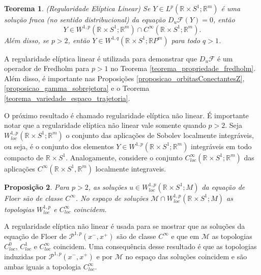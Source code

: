 \documentclass[12pt]{book}
\newtheorem{teorema}{Teorema}[section]
\newtheorem{proposicao}[teorema]{Proposição}
\newcommand{\aplicaoessuaves}[2]{C^{\infty}(#1, #2)}
\newcommand{\caminhosexponenciaisconectantes}[2]{\mathcal{P}^{1,p}(#1, #2)}
\newcommand{\caminhosexponenciaisconectantespadrao}{\caminhosexponenciaisconectantes{x^{-}}{x^{+}}}
\newcommand{\circulo}{S^{1}}
\newcommand{\diferencialfloerponto}[1]{D_{#1}\operadorFloer}
\newcommand{\energiafinitaM}{\mathcal{M}}
\newcommand{\espacoLpcontradominio}[2]{L^{p}(#1;#2)}
\newcommand{\espacosobolevcontradominio}[2]{W^{1,p}(#1;#2)}
\newcommand{\espacosobolevgeral}[2]{W^{1,#1}(#2)}
\newcommand{\operadorFloer}{\mathcal{F}}
\newcommand{\retacartesianocirculo}{\real{} \times \circulo}
\newcommand{\real}[1]{\mathbb{R}^{#1}}
\newcommand{\realprojetivo}[1]{\mathbb{R}P^{#1}}
\begin{document}
	\begin{teorema}\label{teorema_regularidade_eliptica}
		(Regularidade Elíptica Linear) Se $Y \in \espacoLpcontradominio{\retacartesianocirculo}{\real{m}}$ é uma solução fraca (no sentido distribucional) da equação $\diferencialfloerponto{u}(Y) =0$, então 
		$$
		Y \in \espacosobolevcontradominio{\retacartesianocirculo}{\real{m}} \cap C^{\infty}(\retacartesianocirculo;\real{m}).
		$$
		Além disso, se $p>2$, então $Y \in \espacosobolevgeral{q}{\retacartesianocirculo;\realprojetivo{m}}$ para todo $q>1$.
	\end{teorema} 
	
	A regularidade elíptica linear é utilizada para demonstrar que $\diferencialfloerponto{u}$ é um operador de Fredholm para $p>1$ no Teorema \ref{teorema_propriedade_fredholm}. Além disso, é importante nas Proposições  \ref{proposicao_orbitasConectantesZ},  \ref{proposicao_gamma_sobrejetora} e o Teorema \ref{teorema_variedade_espaco_trajetoria}.
	
	O próximo resultado é chamado regularidade elíptica não linear. É importante notar que a regularidade elíptica não linear vale somente quando $p>2$. Seja $W^{1,p}_{loc}(\retacartesianocirculo;\real{m})$ o conjunto das aplicações de Sobolev localmente integráveis, ou seja, é o conjunto dos elementos $Y \in \espacosobolevcontradominio{\retacartesianocirculo}{\real{m}}$ integráveis em todo compacto de $\retacartesianocirculo$. Analogamente, considere o conjunto $C^{\infty}_{loc}(\retacartesianocirculo;\real{m})$ das aplicações $\aplicaoessuaves{\retacartesianocirculo}{\real{m}}$ localmente integraveis.
	
	\begin{proposicao}
		Para $p>2$, as soluções $u\in W^{1,p}_{loc}(\retacartesianocirculo;M)$ da equação de Floer são de classe $C^{\infty}$. No espaço de soluções $\energiafinitaM\cap W^{1,p}_{loc}(\retacartesianocirculo;M)$ as topologias $W^{1,p}_{loc}$ e $C^{\infty}_{loc}$ coincidem.
	\end{proposicao}
	
	A regularidade elíptica não linear é usada para se mostrar que as soluções da equação de Floer de $\caminhosexponenciaisconectantespadrao$ são de classe $C^{\infty}$ e que em $\energiafinitaM$ as topologias $C^{0}_{loc}$, $C^{1}_{loc}$ e $C^{\infty}_{loc}$ coincidem. Uma consequência desse resultado é que as topologias induzidas por $\caminhosexponenciaisconectantespadrao$ e por $\energiafinitaM$ no espaço das soluções coincidem e são ambas iguais a topologia $C^{\infty}_{loc}$.
	
\end{document}
